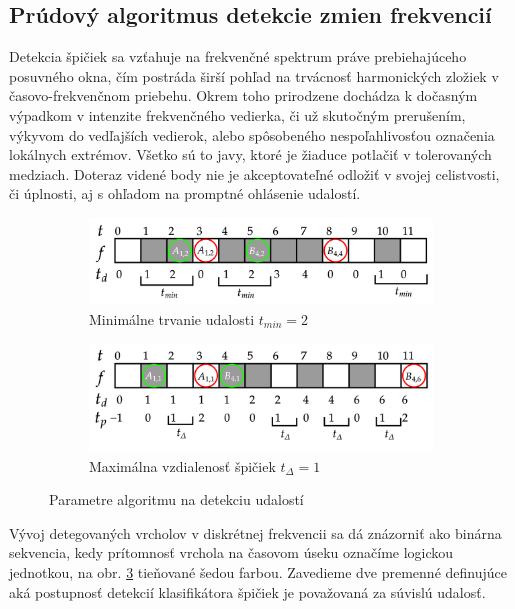 \subsection{Prúdový algoritmus detekcie zmien frekvencií}
Detekcia špičiek sa vzťahuje na frekvenčné spektrum práve prebiehajúceho posuvného okna, čím postráda širší pohľad na trvácnosť
harmonických zložiek v časovo-frekvenčnom priebehu. Okrem toho prirodzene dochádza k dočasným výpadkom v intenzite frekvenčného
vedierka, či už skutočným prerušením, výkyvom do vedľajších vedierok, alebo spôsobeného nespoľahlivosťou označenia lokálnych extrémov.
Všetko sú to javy, ktoré je žiaduce potlačiť v tolerovaných medziach. Doteraz videné body nie je akceptovateľné odložiť v svojej
celistvosti, či úplnosti, aj s ohľadom na promptné ohlásenie udalostí.
\begin{figure}[h!]
\centering
\begin{subfigure}[b]{0.8\textwidth}
    \centering
    \includegraphics[width=\textwidth]{figures/design/event-detection-min-duration.png}
    \caption{Minimálne trvanie udalosti $t_{min} = 2$}
    \label{event-detector:tmin}
\end{subfigure}
\begin{subfigure}[b]{0.8\textwidth}
    \centering
    \includegraphics[width=\textwidth]{figures/design/event-detection-time-proximity.png}
    \caption{Maximálna vzdialenosť špičiek $t_{\Delta} = 1$}
     \label{event-detector:tdelta}
\end{subfigure}
\caption{Parametre algoritmu na detekciu udalostí}
\label{event-detector}
\end{figure}

Vývoj detegovaných vrcholov v diskrétnej frekvencii sa dá znázorniť ako binárna sekvencia, kedy prítomnosť vrchola na časovom úseku
označíme logickou jednotkou, na obr. \ref{event-detector} tieňované šedou farbou. Zavedieme dve premenné definujúce aká postupnosť
detekcií klasifikátora špičiek je považovaná za súvislú udalosť.

